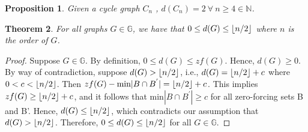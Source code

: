 \documentclass{article}
\DeclarePairedDelimiter\floor{\lfloor}{\rfloor}
\newtheorem{theorem}{Theorem}[section]
\newtheorem{proposition}[theorem]{Proposition}
\theoremstyle{definition}
\begin{document}
\begin{proposition}
Given a cycle graph $C_n$ , $d(C_n)=2 \ \forall \ n \geq 4 \in \mathbb{N}$.
\end{proposition}

\begin{theorem}
For all graphs $G \in \mathbb{G}$, we have that $0 \leq d(G) \leq \floor{n/2}$ where $n$ is the order of $G$.
\end{theorem}
\begin{proof}
Suppose $G \in \mathbb{G}$.
By definition, $0 \leq d(G) \leq zf(G)$.
Hence, $d(G) \geq 0$.
By way of contradiction, suppose $d(G) > \floor{n/2}$, i.e., $d(G) = \floor{n/2} + c$ where $0 < c < \floor{n/2}$.
Then $zf(G) - \text{min}|B \cap B^{'}| = \floor{n/2} + c$.
This implies $zf(G) \geq \floor{n/2} + c$, and it follows that  $\text{min}|B\cap B^{'}| \geq c$ for all zero-forcing sets B and B'. 
Hence, $d(G) \leq \floor{n/2}$, which contradicts our assumption that $d(G) > \floor{n/2}$.
Therefore, $0 \leq d(G) \leq \floor{n/2}$  for all $G \in \mathbb{G}$.

\end{proof}
\end{document}

